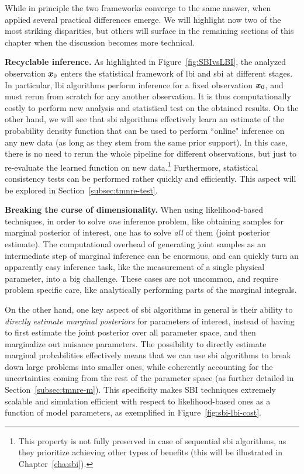 While in principle the two frameworks converge to the same answer, when applied several practical differences emerge. We will highlight now two of the most striking disparities, but others will surface in the remaining sections of this chapter when the discussion becomes more technical.

\noindent \textbf{Recyclable inference.} As highlighted in Figure~\ref{fig:SBIvsLBI}, the analyzed observation $\bm{x}_0$ enters the statistical framework of \gls*{lbi} and \gls*{sbi} at different stages. In particular, \gls*{lbi} algorithms perform inference for a fixed observation $\bm{x}_0$, and must rerun from scratch for any another observation. It is thus computationally costly to perform new analysis and statistical test on the obtained results. On the other hand, we will see that \gls*{sbi} algorithms effectively learn an estimate of the probability density function that can be used to perform ``online" inference on any new data (as long as they stem from the same prior support). In this case, there is no need to rerun the whole pipeline for different observations, but just to re-evaluate the learned function on new data.\footnote{This property is not fully preserved in case of sequential \gls*{sbi} algorithms, as they prioritize achieving other types of benefits (this will be illustrated in Chapter~\ref{cha:sbi}).} Furthermore, statistical consistency tests can be performed rather quickly and efficiently. This aspect will be explored in Section~\ref{subsec:tmnre-test}.

\noindent \textbf{Breaking the curse of dimensionality.} When using likelihood-based techniques, in order to solve \emph{one} inference problem, like obtaining samples for marginal posterior of interest, one has to solve \emph{all} of them (joint posterior estimate). The computational overhead of generating joint samples as an intermediate step of marginal inference can be enormous, and can quickly turn an apparently easy inference task, like the measurement of a single physical parameter, into a big challenge. These cases are not uncommon, and require problem specific care, like analytically performing parts of the marginal integrals. 

On the other hand, one key aspect of \gls*{sbi} algorithms in general is their ability to \emph{directly estimate marginal posteriors} for parameters of interest, instead of having to first estimate the joint posterior over all parameter space, and then marginalize out nuisance parameters. The possibility to directly estimate marginal probabilities effectively means that we can use \gls*{sbi} algorithms to break down large problems into smaller ones, while coherently accounting for the uncertainties coming from the rest of the parameter space (as further detailed in Section~\ref{subsec:tmnre-m}). This specificity makes SBI techniques extremely scalable and simulation efficient with respect to likelihood-based ones as a function of model parameters, as exemplified in Figure~\ref{fig:sbi-lbi-cost}. 








